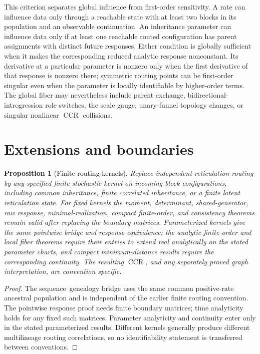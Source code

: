 \documentclass[11pt]{article}
\newtheorem{proposition}[theorem]{Proposition}
\newcommand{\CCR}{\operatorname{CCR}}
\begin{document}
This criterion separates global influence from first-order sensitivity.  A rate can influence data only through a reachable state with at least two blocks in its population and an observable continuation.  An inheritance parameter can influence data only if at least one reachable routed configuration has parent assignments with distinct future responses.  Either condition is globally sufficient when it makes the corresponding reduced analytic response nonconstant.  Its derivative at a particular parameter is nonzero only when the first derivative of that response is nonzero there; symmetric routing points can be first-order singular even when the parameter is locally identifiable by higher-order terms.  The global fiber may nevertheless include parent exchange, bidirectional-introgression role switches, the scale gauge, unary-funnel topology changes, or singular nonlinear $\CCR$ collisions.

\section{Extensions and boundaries}
\label{sec:extensions}

\begin{proposition}[Finite routing kernels]
Replace independent reticulation routing by any specified finite stochastic kernel on incoming block configurations, including common inheritance, finite correlated inheritance, or a finite latent reticulation state.  For fixed kernels the moment, determinant, shared-generator, raw response, minimal-realization, compact finite-order, and consistency theorems remain valid after replacing the boundary matrices.  Parameterized kernels give the same pointwise bridge and response equivalence; the analytic finite-order and local fiber theorems require their entries to extend real analytically on the stated parameter charts, and compact minimum-distance results require the corresponding continuity.  The resulting $\CCR$, and any separately proved graph interpretation, are convention specific.
\end{proposition}

\begin{proof}
The sequence--genealogy bridge uses the same common positive-rate ancestral population and is independent of the earlier finite routing convention.  The pointwise response proof needs finite boundary matrices; time analyticity holds for any fixed such matrices.  Parameter analyticity and continuity enter only in the stated parameterized results.  Different kernels generally produce different multilineage routing correlations, so no identifiability statement is transferred between conventions.
\end{proof}
\end{document}
